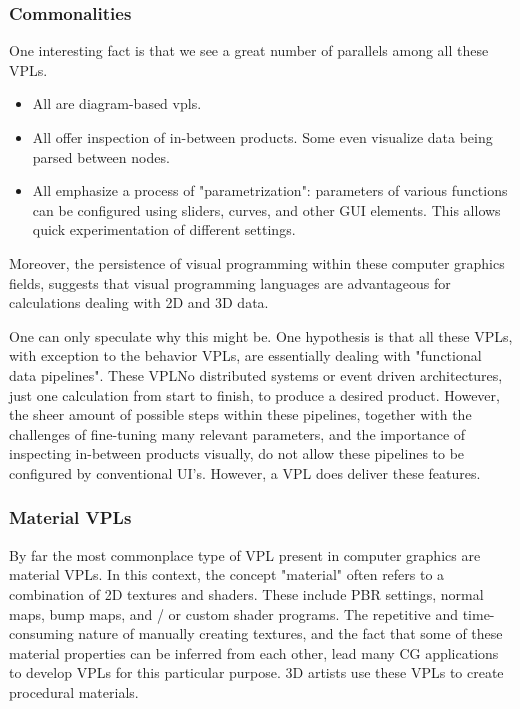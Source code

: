 \subsubsection*{Commonalities}
One interesting fact is that we see a great number of parallels among all these \ac{VPL}s.
\begin{itemize}[-]
  \item All are diagram-based vpls.
  \item All offer inspection of in-between products. Some even visualize data being parsed between nodes.
  \item All emphasize a process of "parametrization": parameters of various functions can be configured using sliders, curves, and other \ac{GUI} elements. This allows quick experimentation of different settings.
\end{itemize}
Moreover, the persistence of visual programming within these computer graphics fields, suggests that visual programming languages are advantageous for calculations dealing with 2D and 3D data.

One can only speculate why this might be. 
One hypothesis is that all these VPLs, with exception to the behavior VPLs, are essentially dealing with "functional data pipelines".
These VPLNo distributed systems or event driven architectures, just one calculation from start to finish, to produce a desired product.  
However, the sheer amount of possible steps within these pipelines, together with the challenges of fine-tuning many relevant parameters, and the importance of inspecting in-between products visually, do not allow these pipelines to be configured by conventional UI's. 
However, a \ac{VPL} does deliver these features.

\subsubsection*{Material VPLs}
By far the most commonplace type of VPL present in computer graphics are material VPLs. 
In this context, the concept "material" often refers to a combination of 2D textures and shaders. 
These include PBR settings, normal maps, bump maps, and / or custom shader programs. 
The repetitive and time-consuming nature of manually creating textures, and the fact that some of these material properties can be inferred from each other, lead many CG applications to develop \ac{VPL}s for this particular purpose. 
3D artists use these \ac{VPL}s to create procedural materials.


